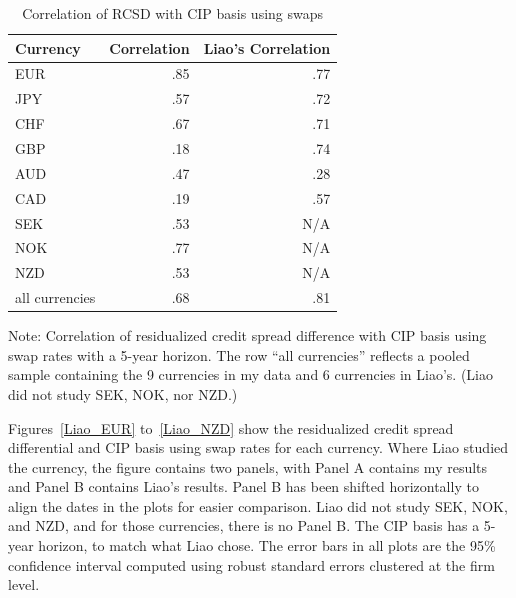 \begin{table}[h]
\caption{\label{liao_correl_table} Correlation of RCSD with CIP basis using swaps}
\centering
\begin{tabular}{ |l|r|r| }
\hline
Currency & Correlation & Liao's Correlation \\
\hline
EUR & .85 & .77 \\
JPY & .57 & .72 \\
CHF & .67 & .71 \\
GBP & .18 & .74 \\
AUD & .47 & .28 \\
CAD & .19 & .57 \\
SEK & .53 & N/A \\
NOK & .77 & N/A \\
NZD & .53 & N/A \\
all currencies & .68 & .81 \\  %
\hline
\end{tabular}

\raggedright 
 Note: {\small Correlation of residualized credit spread difference with CIP basis using swap rates with a 5-year horizon.  The row ``all currencies'' reflects a pooled sample containing the 9 currencies in my data and 6 currencies in Liao's.  (Liao did not study SEK, NOK, nor NZD.)}
\end{table}
 
Figures~\ref{Liao_EUR} to~\ref{Liao_NZD} show the residualized credit spread differential and CIP basis using swap rates for each currency.  Where Liao studied the currency, the figure contains two panels, with Panel A contains my results and Panel B contains Liao's results.  Panel B has been shifted horizontally to align the dates in the plots for easier comparison.  Liao did not study SEK, NOK, and NZD, and for those currencies, there is no Panel B.  The CIP basis has a 5-year horizon, to match what Liao chose.  The error bars in all plots are the 95\% confidence interval computed using robust standard errors clustered at the firm level.

